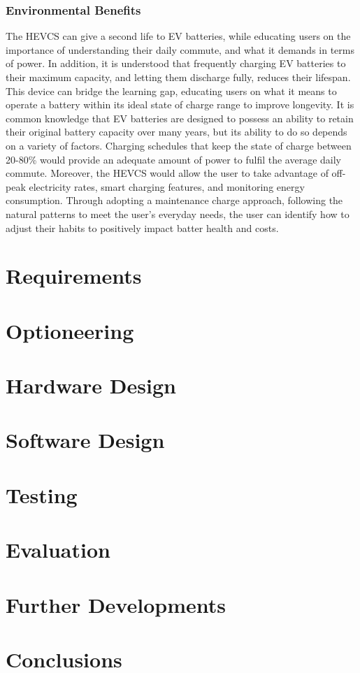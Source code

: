 \documentclass [12pt]{article}
\begin{document}
\subsubsection{Environmental Benefits}
The HEVCS can give a second life to EV batteries, while educating users on the importance of understanding their daily commute, and what it demands in terms of power. In addition, it is understood that frequently charging EV batteries to their maximum capacity, and letting them discharge fully, reduces their lifespan. This device can bridge the learning gap, educating users on what it means to operate a battery within its ideal state of charge range to improve longevity. 
It is common knowledge that EV batteries are designed to possess an ability to retain their original battery capacity over many years, but its ability to do so depends on a variety of factors. Charging schedules that keep the state of charge between 20-80\% would provide an adequate amount of power to fulfil the average daily commute. Moreover, the HEVCS would allow the user to take advantage of off-peak electricity rates, smart charging features, and monitoring energy consumption. Through adopting a maintenance charge approach, following the natural patterns to meet the user’s everyday needs, the user can identify how to adjust their habits to positively impact batter health and costs.


\newpage
\section{Requirements}

\newpage
\section{Optioneering}

\newpage
\section{Hardware Design}

\newpage
\section{Software Design}

\newpage
\section{Testing}

\newpage
\section{Evaluation}

\newpage
\section{Further Developments}

\newpage
\section{Conclusions}

\newpage



\appendix
\end{document}

